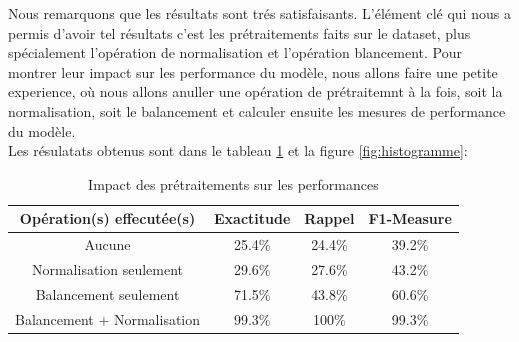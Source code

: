 Nous remarquons que les résultats sont trés satisfaisants. L'élément clé qui nous a permis d'avoir tel résultats c'est les prétraitements faits sur le dataset, plus spécialement l'opération de normalisation et l'opération blancement. Pour montrer leur impact  sur les performance du modèle, nous allons faire une petite experience, où nous allons anuller une opération de prétraitemnt à la fois, soit la normalisation, soit le balancement et calculer ensuite les mesures de performance du modèle.\\

Les résulatats obtenus sont dans le tableau \ref{table:compare} et la figure \ref{fig:histogramme}:

\begin{table}[t]
	\begin{center}
		\begin{tabular}{  | c | c | c | c | }
			\hline
			 Opération(s) effecutée(s) & Exactitude & Rappel & F1-Measure \\
			\hline
			\hline
			Aucune & 25.4\% & 24.4\% & 39.2\% \\
			\hline
			Normalisation seulement & 29.6\% & 27.6\% & 43.2\% \\
			\hline
			Balancement seulement & 71.5\% & 43.8\% & 60.6\% \\
			\hline
			\rowcolor[rgb]{0.9,0.70,0.70}
			Balancement + Normalisation & 99.3\% & 100\% & 99.3\% \\
			\hline
		\end{tabular}
		\caption{Impact des prétraitements sur les performances}
		\label{table:compare}
	\end{center}	
\end{table}

